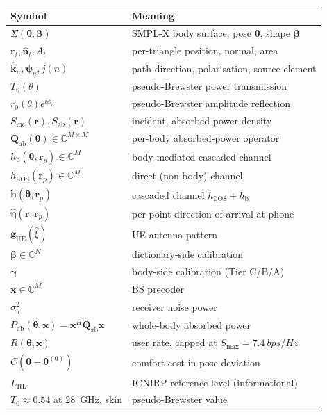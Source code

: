 \documentclass[11pt,a4paper]{article}
\theoremstyle{definition}
\newcommand{\khat}{\hat{\bm{k}}}
\newcommand{\nhat}{\hat{\bm{n}}}
\newcommand{\etahat}{\hat{\bm{\eta}}}
\newcommand{\rr}{\mathbf{r}}
\newcommand{\Sinc}{S_{\mathrm{inc}}}
\newcommand{\Sab}{S_{\mathrm{ab}}}
\newcommand{\Complex}{\mathbb{C}}
\newcommand{\Qabs}{\mathbf{Q}_{\mathrm{ab}}}
\newcommand{\hh}{\mathbf{h}}
\newcommand{\xvec}{\mathbf{x}}
\newcommand{\thetab}{\bm{\theta}}
\newcommand{\betab}{\bm{\beta}}
\newcommand{\Pabs}{P_{\mathrm{ab}}}
\newcommand{\hbody}{h_{\mathrm{b}}}
\newcommand{\hLOS}{h_{\mathrm{LOS}}}
\begin{document}
\begin{center}\small
\begin{tabular}{@{}ll@{}}
\toprule
Symbol & Meaning \\
\midrule
$\Sigma(\thetab,\betab)$ & SMPL-X body surface, pose $\thetab$,
shape $\betab$ \\
$\rr_t,\nhat_t,A_t$ & per-triangle position, normal, area \\
$\khat_n,\bm\psi_n,j(n)$ & path direction, polarisation, source
element \\
$T_0(\theta)$ & pseudo-Brewster power transmission \\
$r_0(\theta)e^{i\phi_r}$ & pseudo-Brewster amplitude reflection \\
$\Sinc(\rr),\Sab(\rr)$ & incident, absorbed power density \\
$\Qabs(\thetab)\in\Complex^{M\times M}$ & per-body absorbed-power
operator \\
$\hbody(\thetab,\rr_p)\in\Complex^M$ & body-mediated cascaded
channel \\
$\hLOS(\rr_p)\in\Complex^M$ & direct (non-body) channel \\
$\hh(\thetab,\rr_p)$ & cascaded channel
$\hLOS+\hbody$ \\
$\etahat(\rr;\rr_p)$ & per-point direction-of-arrival at phone \\
$\bm g_{\mathrm{UE}}(\hat\xi)$ & UE antenna pattern \\
$\bm\beta\in\Complex^N$ & dictionary-side calibration \\
$\bm\gamma$ & body-side calibration (Tier C/B/A) \\
$\xvec\in\Complex^M$ & BS precoder \\
$\sigma_\eta^2$ & receiver noise power \\
$\Pabs(\thetab,\xvec)=\xvec^H\Qabs\xvec$ & whole-body absorbed
power \\
$R(\thetab,\xvec)$ & user rate, capped at $S_{\max}=\SI{7.4}{bps/Hz}$ \\
$C(\thetab-\thetab^{(0)})$ & comfort cost in pose deviation \\
$L_{\mathrm{RL}}$ & ICNIRP reference level (informational) \\
$T_0\approx 0.54$ at \SI{28}{GHz}, skin & pseudo-Brewster value \\
\bottomrule
\end{tabular}
\end{center}
\end{document}
